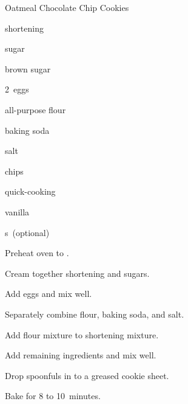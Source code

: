 \begin{recipe}{Oatmeal Chocolate Chip Cookies}{}{}

\begin{ingredients}
\item {} shortening
\item \C{\threequarter} sugar
\item \C{\threequarter} brown sugar
\item 2~eggs
\item \C{1\half} all-purpose flour
\item {} baking soda
\item {} salt
\item \C{2\half}  chips
\item {} quick-cooking 
\item {} vanilla
\item {} s~(optional)
\end{ingredients}

\begin{directions}
\item Preheat oven to .
\item Cream together shortening and sugars.
\item Add eggs and mix well.
\item Separately combine flour, baking soda, and salt.
\item Add flour mixture to shortening mixture.
\item Add remaining ingredients and mix well.
\item Drop spoonfuls in to a greased cookie sheet.
\item Bake for 8 to 10~minutes.
\end{directions}

\end{recipe}
